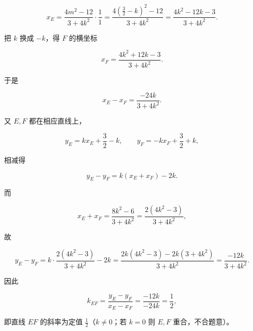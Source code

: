 \begin{answer}
\nopagebreak[4]
\[x_E=\frac{4m^2-12}{3+4k^2}\cdot\frac1{1}
=\frac{4\left(\frac32-k\right)^2-12}{3+4k^2}
=\frac{4k^2-12k-3}{3+4k^2}.\]

把 $k$ 换成 $-k$，得 $F$ 的横坐标

\nopagebreak[4]
\[x_F=\frac{4k^2+12k-3}{3+4k^2}.\]

于是

\nopagebreak[4]
\[x_E-x_F=\frac{-24k}{3+4k^2}.\]

又 $E,F$ 都在相应直线上，

\nopagebreak[4]
\[y_E=kx_E+\frac32-k,\qquad
y_F=-kx_F+\frac32+k,\]

相减得

\nopagebreak[4]
\[y_E-y_F
=k(x_E+x_F)-2k .\]

而

\nopagebreak[4]
\[x_E+x_F
=\frac{8k^2-6}{3+4k^2}
=\frac{2(4k^2-3)}{3+4k^2},\]

故

\nopagebreak[4]
\[y_E-y_F
=k\cdot\frac{2(4k^2-3)}{3+4k^2}-2k
=\frac{2k(4k^2-3)-2k(3+4k^2)}{3+4k^2}
=\frac{-12k}{3+4k^2}.\]

因此

\nopagebreak[4]
\[k_{EF}
=\frac{y_E-y_F}{x_E-x_F}
=\frac{-12k}{-24k}
=\frac12,\]

即直线 $EF$ 的斜率为定值 $\frac12$（$k\neq0$；若 $k=0$ 则 $E,F$ 重合，不合题意）。


\end{answer}

